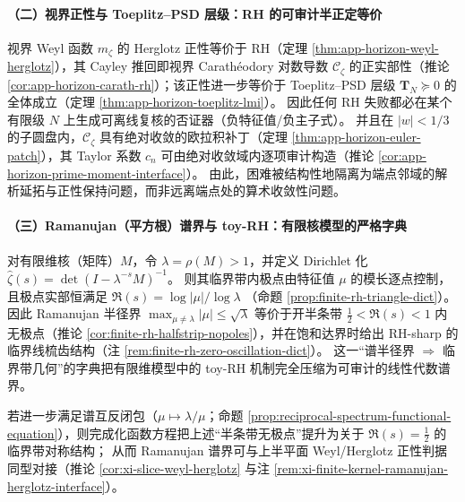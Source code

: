 \paragraph{（二）视界正性与 Toeplitz--PSD 层级：RH 的可审计半正定等价}
视界 Weyl 函数 \(m_{\zeta}\) 的 Herglotz 正性等价于 RH（定理 \ref{thm:app-horizon-weyl-herglotz}），其 Cayley 推回即视界 Carath\'eodory 对数导数 \(\mathscr{C}_{\zeta}\) 的正实部性（推论 \ref{cor:app-horizon-carath-rh}）；该正性进一步等价于 Toeplitz--PSD 层级 \(\mathbf{T}_N\succeq 0\) 的全体成立（定理 \ref{thm:app-horizon-toeplitz-lmi}）。
因此任何 RH 失败都必在某个有限级 \(N\) 上生成可离线复核的否证器（负特征值/负主子式）。
并且在 \(|w|<1/3\) 的子圆盘内，\(\mathscr{C}_{\zeta}\) 具有绝对收敛的欧拉积补丁（定理 \ref{thm:app-horizon-euler-patch}），其 Taylor 系数 \(c_n\) 可由绝对收敛域内逐项审计构造（推论 \ref{cor:app-horizon-prime-moment-interface}）。
由此，困难被结构性地隔离为端点邻域的解析延拓与正性保持问题，而非远离端点处的算术收敛性问题。

\paragraph{（三）Ramanujan（平方根）谱界与 toy-RH：有限核模型的严格字典}
对有限维核（矩阵）\(M\)，令 \(\lambda=\rho(M)>1\)，并定义 Dirichlet 化 \(\widehat{\zeta}(s)=\det(I-\lambda^{-s}M)^{-1}\)。
则其临界带内极点由特征值 \(\mu\) 的模长逐点控制，且极点实部恒满足
\(
\Re(s)=\log|\mu|/\log\lambda
\)
（命题 \ref{prop:finite-rh-triangle-dict}）。
因此 Ramanujan 半径界
\(
\max_{\mu\neq\lambda}|\mu|\le\sqrt{\lambda}
\)
等价于开半条带 \(\tfrac12<\Re(s)<1\) 内无极点（推论 \ref{cor:finite-rh-halfstrip-nopoles}），并在饱和达界时给出 RH-sharp 的临界线梳齿结构（注 \ref{rem:finite-rh-zero-oscillation-dict}）。
这一“谱半径界 \(\Rightarrow\) 临界带几何”的字典把有限维模型中的 toy-RH 机制完全压缩为可审计的线性代数谱界。
\par
若进一步满足谱互反闭包（\(\mu\mapsto \lambda/\mu\)；命题 \ref{prop:reciprocal-spectrum-functional-equation}），则完成化函数方程把上述“半条带无极点”提升为关于 \(\Re(s)=\tfrac12\) 的临界带对称结构；
从而 Ramanujan 谱界可与上半平面 Weyl/Herglotz 正性判据同型对接（推论 \ref{cor:xi-slice-weyl-herglotz} 与注 \ref{rem:xi-finite-kernel-ramanujan-herglotz-interface}）。

